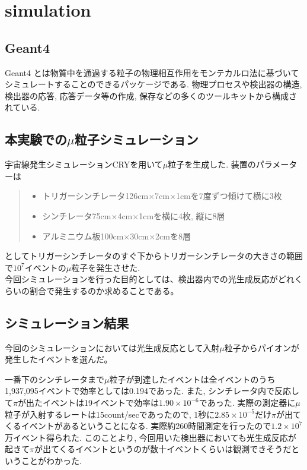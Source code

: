 \chapter{simulation}\label{simulation}
\section{Geant4}
Geant4 とは物質中を通過する粒子の物理相互作用をモンテカルロ法に基づいてシミュレートすることのできるパッケージである.
物理プロセスや検出器の構造, 検出器の応答, 応答データ等の作成, 保存などの多くのツールキットから構成されている.

\section{本実験での$\mu$粒子シミュレーション}
宇宙線発生シミュレーションCRYを用いて$\mu$粒子を生成した.
装置のパラメーターは
\begin{quote}
    \begin{itemize}
        \item トリガーシンチレータ126cm$\times$7cm$\times$1cmを7度ずつ傾けて横に3枚
        \item シンチレータ75cm$\times$4cm$\times$1cmを横に4枚, 縦に8層
        \item アルミニウム板100cm$\times$30cm$\times$2cmを8層
    \end{itemize}
\end{quote}
としてトリガーシンチレータのすぐ下からトリガーシンチレータの大きさの範囲で$10^{7}$イベントの$\mu$粒子を発生させた.
\\
今回シミュレーションを行った目的としては、検出器内での光生成反応がどれくらいの割合で発生するのか求めることである。

\section{シミュレーション結果}
今回のシミュレーションにおいては光生成反応として入射$\mu$粒子からパイオンが発生したイベントを選んだ。

一番下のシンチレータまで$\mu$粒子が到達したイベントは全イベントのうち1,937,095イベントで効率としては0.194であった.
また, シンチレータ内で反応して$\pi$が出たイベントは19イベントで効率は$1.90 \times10^{-6}$であった.
実際の測定器に$\mu$粒子が入射するレートは15count/secであったので, 1秒に$2.85 \times10^{-5}$だけ$\pi$が出てくるイベントがあるということになる.
実際約260時間測定を行ったので$1.2 \times10^{7}$万イベント得られた.
このことより, 今回用いた検出器においても光生成反応が起きて$\pi$が出てくるイベントというのが数十イベントくらいは観測できそうだということがわかった.

